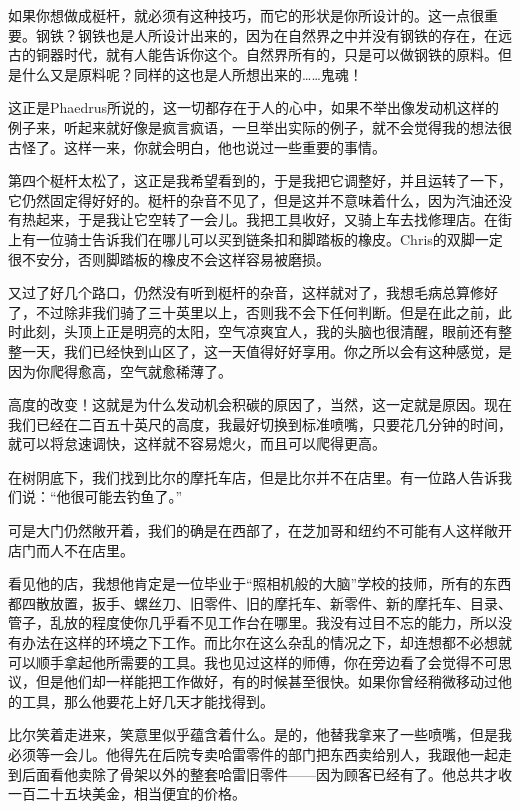 \documentclass[UTF8]{article}
\begin{document}
\par 如果你想做成梃杆，就必须有这种技巧，而它的形状是你所设计的。这一点很重要。钢铁？钢铁也是人所设计出来的，因为在自然界之中并没有钢铁的存在，在远古的铜器时代，就有人能告诉你这个。自然界所有的，只是可以做钢铁的原料。但是什么又是原料呢？同样的这也是人所想出来的……鬼魂！
\par 这正是Phaedrus所说的，这一切都存在于人的心中，如果不举出像发动机这样的例子来，听起来就好像是疯言疯语，一旦举出实际的例子，就不会觉得我的想法很古怪了。这样一来，你就会明白，他也说过一些重要的事情。
\par 第四个梃杆太松了，这正是我希望看到的，于是我把它调整好，并且运转了一下，它仍然固定得好好的。梃杆的杂音不见了，但是这并不意味着什么，因为汽油还没有热起来，于是我让它空转了一会儿。我把工具收好，又骑上车去找修理店。在街上有一位骑士告诉我们在哪儿可以买到链条扣和脚踏板的橡皮。Chris的双脚一定很不安分，否则脚踏板的橡皮不会这样容易被磨损。
\par 又过了好几个路口，仍然没有听到梃杆的杂音，这样就对了，我想毛病总算修好了，不过除非我们骑了三十英里以上，否则我不会下任何判断。但是在此之前，此时此刻，头顶上正是明亮的太阳，空气凉爽宜人，我的头脑也很清醒，眼前还有整整一天，我们已经快到山区了，这一天值得好好享用。你之所以会有这种感觉，是因为你爬得愈高，空气就愈稀薄了。
\par 高度的改变！这就是为什么发动机会积碳的原因了，当然，这一定就是原因。现在我们已经在二百五十英尺的高度，我最好切换到标准喷嘴，只要花几分钟的时间，就可以将怠速调快，这样就不容易熄火，而且可以爬得更高。
\par 在树阴底下，我们找到比尔的摩托车店，但是比尔并不在店里。有一位路人告诉我们说：“他很可能去钓鱼了。”
\par 可是大门仍然敞开着，我们的确是在西部了，在芝加哥和纽约不可能有人这样敞开店门而人不在店里。
\par 看见他的店，我想他肯定是一位毕业于“照相机般的大脑”学校的技师，所有的东西都四散放置，扳手、螺丝刀、旧零件、旧的摩托车、新零件、新的摩托车、目录、管子，乱放的程度使你几乎看不见工作台在哪里。我没有过目不忘的能力，所以没有办法在这样的环境之下工作。而比尔在这么杂乱的情况之下，却连想都不必想就可以顺手拿起他所需要的工具。我也见过这样的师傅，你在旁边看了会觉得不可思议，但是他们却一样能把工作做好，有的时候甚至很快。如果你曾经稍微移动过他的工具，那么他要花上好几天才能找得到。
\par 比尔笑着走进来，笑意里似乎蕴含着什么。是的，他替我拿来了一些喷嘴，但是我必须等一会儿。他得先在后院专卖哈雷零件的部门把东西卖给别人，我跟他一起走到后面看他卖除了骨架以外的整套哈雷旧零件——因为顾客已经有了。他总共才收一百二十五块美金，相当便宜的价格。
\end{document}
